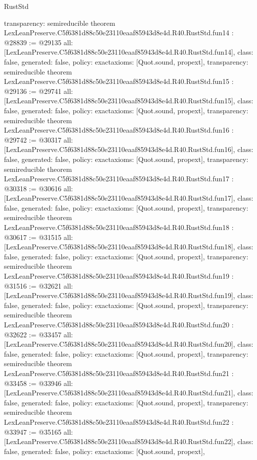 \begin{lexlean}{RustStd}
\begin{coremodule}
{  transparency: semireducible
}
theorem LexLeanPreserve.C5f6381d88c50e23110eaaf85943d8e4d.R40.RustStd.fun14 : @28839 := @29135 {
  all: [LexLeanPreserve.C5f6381d88c50e23110eaaf85943d8e4d.R40.RustStd.fun14],
  class: false,
  generated: false,
  policy: exact{axioms: [Quot.sound, propext]},
  transparency: semireducible
}
theorem LexLeanPreserve.C5f6381d88c50e23110eaaf85943d8e4d.R40.RustStd.fun15 : @29136 := @29741 {
  all: [LexLeanPreserve.C5f6381d88c50e23110eaaf85943d8e4d.R40.RustStd.fun15],
  class: false,
  generated: false,
  policy: exact{axioms: [Quot.sound, propext]},
  transparency: semireducible
}
theorem LexLeanPreserve.C5f6381d88c50e23110eaaf85943d8e4d.R40.RustStd.fun16 : @29742 := @30317 {
  all: [LexLeanPreserve.C5f6381d88c50e23110eaaf85943d8e4d.R40.RustStd.fun16],
  class: false,
  generated: false,
  policy: exact{axioms: [Quot.sound, propext]},
  transparency: semireducible
}
theorem LexLeanPreserve.C5f6381d88c50e23110eaaf85943d8e4d.R40.RustStd.fun17 : @30318 := @30616 {
  all: [LexLeanPreserve.C5f6381d88c50e23110eaaf85943d8e4d.R40.RustStd.fun17],
  class: false,
  generated: false,
  policy: exact{axioms: [Quot.sound, propext]},
  transparency: semireducible
}
theorem LexLeanPreserve.C5f6381d88c50e23110eaaf85943d8e4d.R40.RustStd.fun18 : @30617 := @31515 {
  all: [LexLeanPreserve.C5f6381d88c50e23110eaaf85943d8e4d.R40.RustStd.fun18],
  class: false,
  generated: false,
  policy: exact{axioms: [Quot.sound, propext]},
  transparency: semireducible
}
theorem LexLeanPreserve.C5f6381d88c50e23110eaaf85943d8e4d.R40.RustStd.fun19 : @31516 := @32621 {
  all: [LexLeanPreserve.C5f6381d88c50e23110eaaf85943d8e4d.R40.RustStd.fun19],
  class: false,
  generated: false,
  policy: exact{axioms: [Quot.sound, propext]},
  transparency: semireducible
}
theorem LexLeanPreserve.C5f6381d88c50e23110eaaf85943d8e4d.R40.RustStd.fun20 : @32622 := @33457 {
  all: [LexLeanPreserve.C5f6381d88c50e23110eaaf85943d8e4d.R40.RustStd.fun20],
  class: false,
  generated: false,
  policy: exact{axioms: [Quot.sound, propext]},
  transparency: semireducible
}
theorem LexLeanPreserve.C5f6381d88c50e23110eaaf85943d8e4d.R40.RustStd.fun21 : @33458 := @33946 {
  all: [LexLeanPreserve.C5f6381d88c50e23110eaaf85943d8e4d.R40.RustStd.fun21],
  class: false,
  generated: false,
  policy: exact{axioms: [Quot.sound, propext]},
  transparency: semireducible
}
theorem LexLeanPreserve.C5f6381d88c50e23110eaaf85943d8e4d.R40.RustStd.fun22 : @33947 := @35165 {
  all: [LexLeanPreserve.C5f6381d88c50e23110eaaf85943d8e4d.R40.RustStd.fun22],
  class: false,
  generated: false,
  policy: exact{axioms: [Quot.sound, propext]},
}
\end{coremodule}
\end{lexlean}
